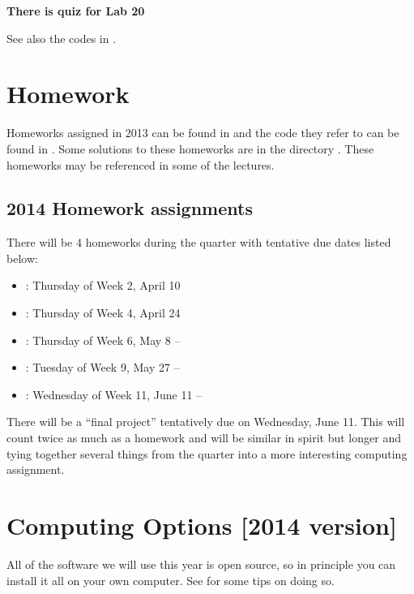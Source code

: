 \documentclass[letterpaper,10pt,english]{sphinxmanual}
\begin{document}
\textbf{There is quiz for Lab 20}

See also the codes in .


\section{Homework}
\label{homeworks:homeworks}\label{homeworks::doc}\label{homeworks:homework}
Homeworks assigned in 2013 can be found in {\hyperref[2013/homeworks:homeworks]{}} and the
code they refer to can be found in .  Some
solutions to these homeworks are in the directory .
These homeworks may be referenced in some of the lectures.


\subsection{2014 Homework assignments}
\label{homeworks:homework-assignments}
There will be 4 homeworks during the quarter with
tentative due dates listed below:
\begin{itemize}
\item {} 
: Thursday of Week 2, April 10

\item {} 
: Thursday of Week 4, April 24

\item {} 
: Thursday of Week 6, May 8 -- 

\item {} 
: Tuesday of Week 9, May 27 -- 

\item {} 
: Wednesday of Week 11, June 11 -- 

\end{itemize}

There will be a ``final project'' tentatively due on Wednesday, June 11.
This will count twice as much as a homework and will be similar in
spirit but longer and tying together several things from the quarter
into a more interesting computing assignment.


\section{Computing Options {[}2014 version{]}}
\label{computing_options:computing-options-2014-version}\label{computing_options::doc}\label{computing_options:computing-options}
All of the software we will use this year is open source, so in principle
you can install it all on your own computer.  See {\hyperref[software_installation:software\string-installation]{}}
for some tips on doing so.
\end{document}
